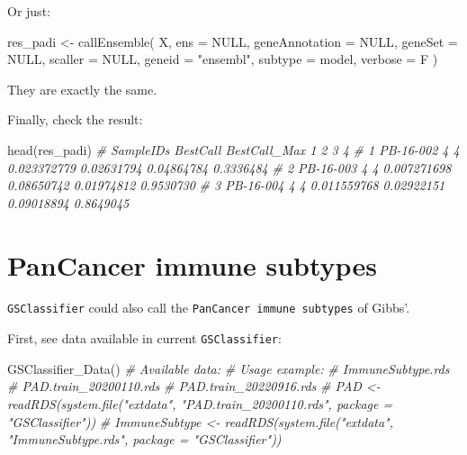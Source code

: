\documentclass[
  12pt,
]{book}
\newenvironment{Shaded}{\begin{snugshade}}{\end{snugshade}}
\newcommand{\AttributeTok}[1]{\textcolor[rgb]{0.77,0.63,0.00}{#1}}
\newcommand{\CommentTok}[1]{\textcolor[rgb]{0.56,0.35,0.01}{\textit{#1}}}
\newcommand{\ConstantTok}[1]{\textcolor[rgb]{0.00,0.00,0.00}{#1}}
\newcommand{\FunctionTok}[1]{\textcolor[rgb]{0.00,0.00,0.00}{#1}}
\newcommand{\NormalTok}[1]{#1}
\newcommand{\OtherTok}[1]{\textcolor[rgb]{0.56,0.35,0.01}{#1}}
\newcommand{\StringTok}[1]{\textcolor[rgb]{0.31,0.60,0.02}{#1}}
\begin{document}
Or just:

\begin{Shaded}
\begin{Highlighting}[]
\NormalTok{res\_padi }\OtherTok{\textless{}{-}} \FunctionTok{callEnsemble}\NormalTok{(}
\NormalTok{  X,}
  \AttributeTok{ens =} \ConstantTok{NULL}\NormalTok{,}
  \AttributeTok{geneAnnotation =} \ConstantTok{NULL}\NormalTok{,}
  \AttributeTok{geneSet =} \ConstantTok{NULL}\NormalTok{,}
  \AttributeTok{scaller =} \ConstantTok{NULL}\NormalTok{,}
  \AttributeTok{geneid =} \StringTok{"ensembl"}\NormalTok{,}
  \AttributeTok{subtype =}\NormalTok{ model, }
  \AttributeTok{verbose =}\NormalTok{ F}
\NormalTok{)}
\end{Highlighting}
\end{Shaded}

They are exactly the same.

Finally, check the result:

\begin{Shaded}
\begin{Highlighting}[]
\FunctionTok{head}\NormalTok{(res\_padi)}
\CommentTok{\#   SampleIDs BestCall BestCall\_Max           1          2          3         4}
\CommentTok{\# 1 PB{-}16{-}002        4            4 0.023372779 0.02631794 0.04864784 0.3336484}
\CommentTok{\# 2 PB{-}16{-}003        4            4 0.007271698 0.08650742 0.01974812 0.9530730}
\CommentTok{\# 3 PB{-}16{-}004        4            4 0.011559768 0.02922151 0.09018894 0.8649045}
\end{Highlighting}
\end{Shaded}

\hypertarget{pancancer-immune-subtypes}{%
\section{PanCancer immune subtypes}\label{pancancer-immune-subtypes}}

\texttt{GSClassifier} could also call the \texttt{PanCancer\ immune\ subtypes} of Gibbs'.

First, see data available in current \texttt{GSClassifier}:

\begin{Shaded}
\begin{Highlighting}[]
\FunctionTok{GSClassifier\_Data}\NormalTok{()}
\CommentTok{\# Available data:}
\CommentTok{\# Usage example:}
\CommentTok{\#   ImmuneSubtype.rds }
\CommentTok{\#   PAD.train\_20200110.rds }
\CommentTok{\#   PAD.train\_20220916.rds }
\CommentTok{\#   PAD \textless{}{-} readRDS(system.file("extdata", "PAD.train\_20200110.rds", package = "GSClassifier")) }
\CommentTok{\#   ImmuneSubtype \textless{}{-} readRDS(system.file("extdata", "ImmuneSubtype.rds", package = "GSClassifier"))}
\end{Highlighting}
\end{Shaded}
\end{document}

